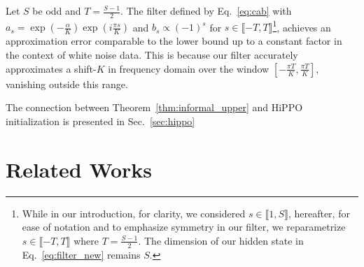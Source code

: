 \begin{theorem}
Let $S$ be odd and $T = \frac{S-1}{2}$. The filter defined by Eq.~\eqref{eq:cab} with $a_s = \exp\left(-\frac{\alpha}{K}\right)\exp\left(i\frac{\pi s}{K}\right)$ and  $b_s \propto (-1)^s$ for $ s \in \llbracket -T, T\rrbracket$\footnote{While in our introduction, for clarity, we considered $s\in\llbracket1,S\rrbracket$, hereafter, for ease of notation and to emphasize symmetry in our filter, we reparametrize $s\in\llbracket -T,T\rrbracket$ where $T = \frac{S-1}{2}$. The dimension of our hidden state in Eq.~\eqref{eq:filter_new} remains $S$.},   achieves an approximation error comparable to the lower bound up to a constant factor in the context of white noise data. This is because our filter accurately approximates a shift-$K$ in frequency domain over the window \(\left[- \frac{\pi T}{K}, \frac{\pi T}{K} \right]\), vanishing outside this range.
\label{thm:informal_upper}
\end{theorem}



The connection between Theorem~\ref{thm:informal_upper} and HiPPO initialization is presented in Sec.~\ref{sec:hippo}



\section{Related Works}
\label{rw}

